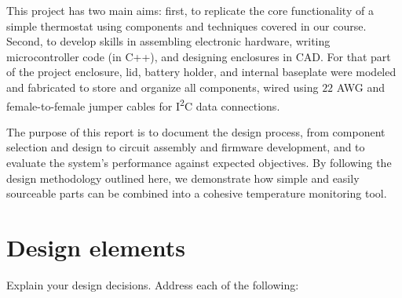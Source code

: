 \documentclass[10pt]{article}
\begin{document}
This project has two main aims: first, to replicate the core functionality of a
simple thermostat using components and techniques covered in our course. Second,
to develop skills in assembling electronic hardware, writing
microcontroller code (in C++), and designing enclosures in CAD. For that part of the project
enclosure, lid, battery holder, and internal baseplate were modeled and
fabricated to store and organize all components, wired using $22$ AWG and
female-to-female jumper cables for I\textsuperscript{2}C data connections.

The purpose of this report is to document the design process, from component
selection and design to circuit assembly and firmware development, and
to evaluate the system's performance against expected objectives. By following
the design methodology outlined here, we demonstrate how simple and
easily sourceable parts can be combined into a cohesive temperature
monitoring tool.


\section{Design elements} Explain your design decisions. Address each of the
following:
\end{document}
